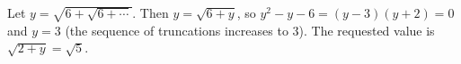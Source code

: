 Let $y=\sqrt{6+\sqrt{6+\cdots}}$. Then $y=\sqrt{6+y}$, so $y^2-y-6=(y-3)(y+2)=0$ and $y=3$ (the sequence of truncations increases to $3$). The requested value is $\sqrt{2+y}=\boxed{\sqrt5}$.
